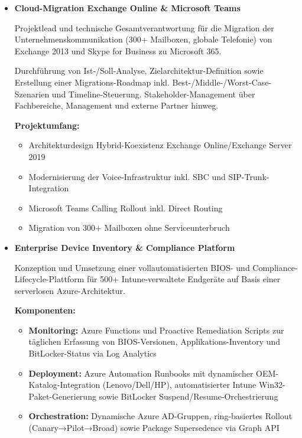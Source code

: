\documentclass{cv}
\begin{document}
\begin{itemize}[leftmargin=*]

\item \textbf{Cloud-Migration Exchange Online \& Microsoft Teams}

Projektlead und technische Gesamtverantwortung für die Migration der Unternehmenskommunikation (300+ Mailboxen, globale Telefonie) von Exchange 2013 und Skype for Business zu Microsoft 365.

Durchführung von Ist-/Soll-Analyse, Zielarchitektur-Definition sowie Erstellung einer Migrations-Roadmap inkl. Best-/Middle-/Worst-Case-Szenarien und Timeline-Steuerung. Stakeholder-Management über Fachbereiche, Management und externe Partner hinweg.

\smallskip
\textbf{Projektumfang:}
\begin{itemize}[nosep]
    \item Architekturdesign Hybrid-Koexistenz Exchange Online/Exchange Server 2019
    \item Modernisierung der Voice-Infrastruktur inkl. SBC und SIP-Trunk-Integration
    \item Microsoft Teams Calling Rollout inkl. Direct Routing
    \item Migration von 300+ Mailboxen ohne Serviceunterbruch
\end{itemize}



\vspace{0.3cm}

\item \textbf{Enterprise Device Inventory \& Compliance Platform}

Konzeption und Umsetzung einer vollautomatisierten BIOS- und Compliance-Lifecycle-Plattform für 500+ Intune-verwaltete Endgeräte auf Basis einer serverlosen Azure-Architektur.

\smallskip
\textbf{Komponenten:}
\begin{itemize}[nosep]
    \item \textbf{Monitoring:} Azure Functions und Proactive Remediation Scripts zur täglichen Erfassung von BIOS-Versionen, Applikations-Inventory und BitLocker-Status via Log Analytics
    \newpage
    \item \textbf{Deployment:} Azure Automation Runbooks mit dynamischer OEM-Katalog-Integration (Lenovo/Dell/HP), automatisierter Intune Win32-Paket-Generierung sowie BitLocker Suspend/Resume-Orchestrierung
    
    \item \textbf{Orchestration:} Dynamische Azure AD-Gruppen, ring-basiertes Rollout \\(Canary→Pilot→Broad) sowie Package Supersedence via Graph API
    

\end{itemize}
\end{itemize}
\end{document}
